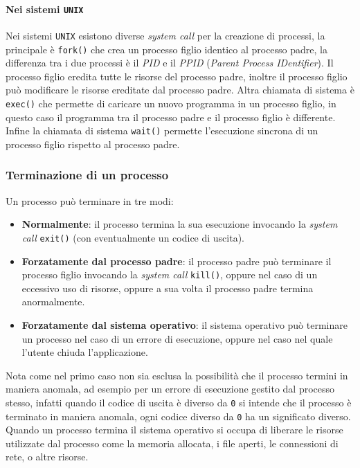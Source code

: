             \paragraph{Nei sistemi \texttt{UNIX}} Nei sistemi \texttt{UNIX} esistono diverse \textit{system call} per la creazione di processi, la principale è \texttt{fork()} che crea un processo figlio identico al processo padre, la differenza tra i due processi è il \textit{PID} e il \textit{PPID} (\textit{Parent Process IDentifier}). Il processo figlio eredita tutte le risorse del processo padre, inoltre il processo figlio può modificare le risorse ereditate dal processo padre. Altra chiamata di sistema è \texttt{exec()} che permette di caricare un nuovo programma in un processo figlio, in questo caso il programma tra il processo padre e il processo figlio è differente. Infine la chiamata di sistema \texttt{wait()} permette l'esecuzione sincrona di un processo figlio rispetto al processo padre.
        \subsubsection{Terminazione di un processo}
            Un processo può terminare in tre modi:
            \begin{itemize}
                \item \textbf{Normalmente}: il processo termina la sua esecuzione invocando la \textit{system call} \texttt{exit()} (con eventualmente un codice di uscita).
                \item \textbf{Forzatamente dal processo padre}: il processo padre può terminare il processo figlio invocando la \textit{system call} \texttt{kill()}, oppure nel caso di un eccessivo uso di risorse, oppure a sua volta il processo padre termina anormalmente.
                \item \textbf{Forzatamente dal sistema operativo}: il sistema operativo può terminare un processo nel caso di un errore di esecuzione, oppure nel caso nel quale l'utente chiuda l'applicazione.
            \end{itemize}
            Nota come nel primo caso non sia esclusa la possibilità che il processo termini in maniera anomala, ad esempio per un errore di esecuzione gestito dal processo stesso, infatti quando il codice di uscita è diverso da \texttt{0} si intende che il processo è terminato in maniera anomala, ogni codice diverso da \texttt{0} ha un significato diverso.\newline
            Quando un processo termina il sistema operativo si occupa di liberare le risorse utilizzate dal processo come la memoria allocata, i file aperti, le connessioni di rete, o altre risorse.
